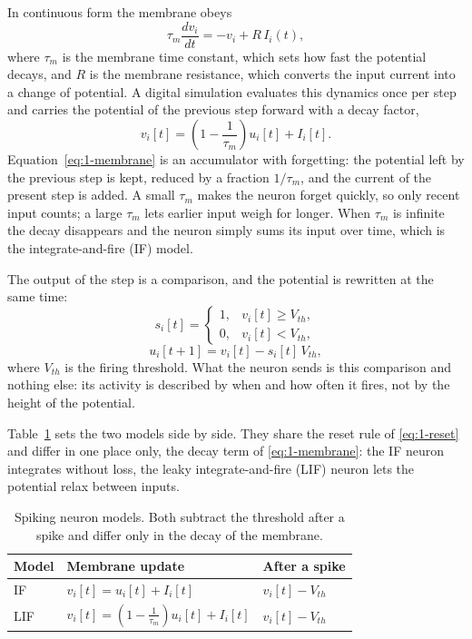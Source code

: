In continuous form the membrane obeys
\begin{equation}
\tau_m \frac{dv_i}{dt} = -v_i + R\,I_i(t),
\label{eq:1-ode}
\end{equation}
where $\tau_m$ is the membrane time constant, which sets how fast the potential
decays, and $R$ is the membrane resistance, which converts the input current
into a change of potential. A
digital simulation evaluates this dynamics once per step and carries the
potential of the previous step forward with a decay factor,
\begin{equation}
v_i[t] = \left(1-\frac{1}{\tau_m}\right)u_i[t] + I_i[t] .
\label{eq:1-membrane}
\end{equation}
Equation~\eqref{eq:1-membrane} is an accumulator with forgetting: the potential
left by the previous step is kept, reduced by a fraction $1/\tau_m$, and the
current of the present step is added. A small $\tau_m$ makes the neuron forget
quickly, so only recent input counts; a large $\tau_m$ lets earlier input weigh
for longer. When $\tau_m$ is infinite the decay disappears and the neuron simply
sums its input over time, which is the integrate-and-fire (IF) model.

The output of the step is a comparison, and the potential is rewritten at the
same time:
\begin{equation}
s_i[t] =
\begin{cases}
1, & v_i[t] \geq V_{th}, \\
0, & v_i[t] < V_{th},
\end{cases}
\label{eq:1-spike}
\end{equation}
\begin{equation}
u_i[t+1] = v_i[t] - s_i[t]\,V_{th} ,
\label{eq:1-reset}
\end{equation}
where $V_{th}$ is the firing threshold. What the neuron sends is this comparison
and nothing else: its activity is described by when and how often it fires, not
by the height of the potential. 

Table~\ref{tab:1-neurons} sets the two models side by side. They share the reset
rule of \eqref{eq:1-reset} and differ in one place only, the decay term of
\eqref{eq:1-membrane}: the IF neuron integrates without loss, the leaky
integrate-and-fire (LIF) neuron lets the potential relax between inputs.

\begin{table}[!ht]
\centering
\caption{Spiking neuron models. Both subtract the threshold after a spike and
differ only in the decay of the membrane.}
\label{tab:1-neurons}
\footnotesize
\begin{tabularx}{\columnwidth}{|p{1.0cm}|X|p{2.3cm}|}
\hline
\textbf{Model} & \textbf{Membrane update} & \textbf{After a spike} \\
\hline
IF & $v_i[t]=u_i[t]+I_i[t]$ & $v_i[t]-V_{th}$ \\
\hline
LIF & $v_i[t]=\left(1-\frac{1}{\tau_m}\right)u_i[t]+I_i[t]$ & $v_i[t]-V_{th}$ \\
\hline
\end{tabularx}
\end{table}

